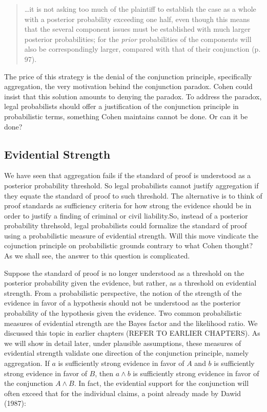\documentclass[10pt,dvipsnames,enabledeprecatedfontcommands]{scrartcl}
\begin{document}
\begin{quote}
\dots it is not asking too much of the plaintiff to establish the case as a whole with a posterior probability exceeding one half, even though this means  that the several component issues must be established with much larger posterior probabilities; for the \textit{prior}  probabilities of the components will also be correspondingly larger, compared with that of their conjunction (p. 97).
 \end{quote}

\noindent  The price of this strategy is the denial of the conjunction
principle, specifically aggregation, the very motivation behind the
conjunction paradox. Cohen could insist that this solution amounts to
denying the paradox. To address the paradox, legal probabilists should
offer a justification of the conjunction principle in probabilistic
terms, something Cohen maintains cannot be done. Or can it be done?

\subsection{Evidential Strength}\label{evidential-strength}

We have seen that aggregation fails if the standard of proof is
understood as a posterior probability threshold. So legal probabilists
cannot justify aggregation if they equate the standard of proof to such
threshold. The alternative is to think of proof standards as sufficiency
criteria for how strong the evidence should be in order to justify a
finding of criminal or civil liability.So, instead of a posterior
probability threhsold, legal probabilists could formalize the standard
of proof using a probabilistic measure of evidential strength. Will this
move vindicate the cojunction principle on probabilistic grounds
contrary to what Cohen thought? As we shall see, the answer to this
question is complicated.

Suppose the standard of proof is no longer understood as a threshold on
the posterior probability given the evidence, but rather, as a threshold
on evidential strength. From a probabilistic perspective, the notion of
the strength of the evidence in favor of a hypothesis should not be
understood as the posterior probability of the hypothesis given the
evidence. Two common probabilistic measures of evidential strength are
the Bayes factor and the likelihood ratio. We discussed this topic in
earlier chapters (REFER TO EARLIER CHAPTERS). As we will show in detail
later, under plausible assumptions, these measures of evidential
strength validate one direction of the conjunction principle, namely
aggregation. If \(a\) is sufficiently strong evidence in favor of \(A\)
and \(b\) is sufficiently strong evidence in favor of \(B\), then
\(a\wedge b\) is sufficiently strong evidence in favor of the
conjunction \(A \wedge B\). In fact, the evidential support for the
conjunction will often exceed that for the individual claims, a point
already made by Dawid (1987):
\end{document}
